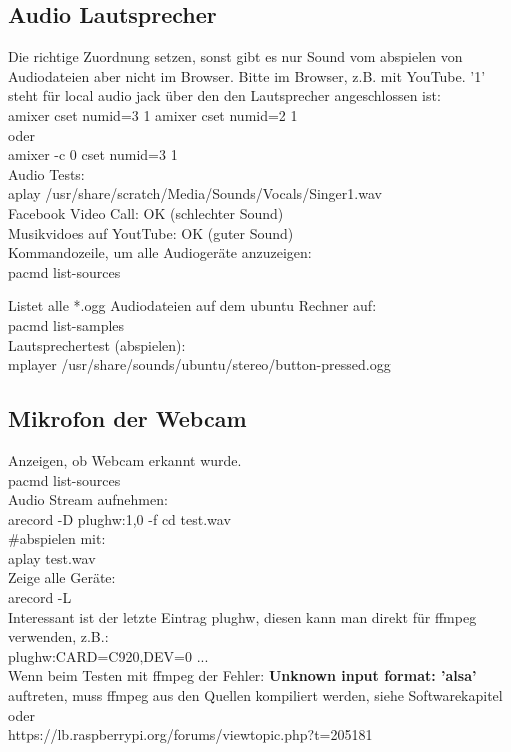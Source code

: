 \subsection{Audio Lautsprecher}

Die richtige Zuordnung setzen, sonst gibt es nur Sound vom 
abspielen von Audiodateien aber nicht im Browser. Bitte im 
Browser, z.B. mit YouTube. '1' steht für local audio jack über 
den den Lautsprecher angeschlossen ist:\\
amixer cset numid=3 1
amixer cset numid=2 1\\
oder \\
amixer -c 0 cset numid=3 1\\

Audio Tests:\\
aplay /usr/share/scratch/Media/Sounds/Vocals/Singer1.wav\\
Facebook Video Call: OK (schlechter Sound)\\
Musikvidoes auf YoutTube: OK (guter Sound)\\

Kommandozeile, um alle Audiogeräte anzuzeigen:\\
pacmd list-sources

Listet alle *.ogg Audiodateien auf dem ubuntu Rechner auf:\\
pacmd list-samples\\
Lautsprechertest (abspielen):\\
mplayer /usr/share/sounds/ubuntu/stereo/button-pressed.ogg 

\subsection{Mikrofon der Webcam}
Anzeigen, ob Webcam erkannt wurde.\\
pacmd list-sources\\ 

Audio Stream aufnehmen:\\
arecord -D plughw:1,0 -f cd test.wav\\
\#abspielen mit:\\
aplay test.wav\\

Zeige alle Geräte:\\
arecord -L\\
Interessant ist der letzte Eintrag plughw, diesen kann man direkt für
ffmpeg verwenden, z.B.:\\
plughw:CARD=C920,DEV=0 ...\\

Wenn beim Testen mit ffmpeg der Fehler: 
\textbf{Unknown input format: 'alsa'}\\ 
auftreten, muss ffmpeg aus den Quellen kompiliert werden, siehe 
Softwarekapitel oder\\ 
https://lb.raspberrypi.org/forums/viewtopic.php?t=205181


 